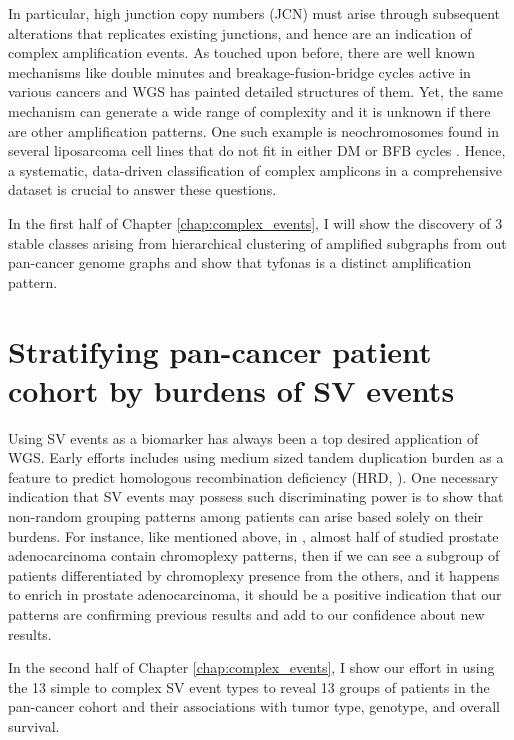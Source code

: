 \documentclass[phd,tocprelim]{cornell}
\begin{document}
In particular, high junction copy numbers (JCN) must arise through subsequent alterations that replicates existing junctions, and hence are an indication of complex amplification events. As touched upon before, there are well known mechanisms like double minutes and breakage-fusion-bridge cycles active in various cancers and WGS has painted detailed structures of them. Yet, the same mechanism can generate a wide range of complexity \cite{Deshpande2019-gs} and it is unknown if there are other amplification patterns. One such example is neochromosomes found in several liposarcoma cell lines that do not fit in either DM or BFB cycles \cite{garsed2014}. Hence, a systematic, data-driven classification of complex amplicons in a comprehensive dataset is crucial to answer these questions.

In the first half of Chapter \ref{chap:complex_events}, I will show the discovery of 3 stable classes arising from hierarchical clustering of amplified subgraphs from out pan-cancer genome graphs and show that tyfonas is a distinct amplification pattern.

\section{Stratifying pan-cancer patient cohort by burdens of SV events}
Using SV events as a biomarker has always been a top desired application of WGS. Early efforts includes using medium sized tandem duplication burden as a feature to predict homologous recombination deficiency (HRD, \cite{Davies:2017642}). One necessary indication that SV events may possess such discriminating power is to show that non-random grouping patterns among patients can arise based solely on their burdens. For instance, like mentioned above, in \cite{baca2013}, almost half of studied prostate adenocarcinoma contain chromoplexy patterns, then if we can see a subgroup of patients differentiated by chromoplexy presence from the others, and it happens to enrich in prostate adenocarcinoma, it should be a positive indication that our patterns are confirming previous results and add to our confidence about new results.

In the second half of Chapter \ref{chap:complex_events}, I show our effort in using the 13 simple to complex SV event types to reveal 13 groups of patients in the pan-cancer cohort and their associations with tumor type, genotype, and overall survival. 

\end{document}
